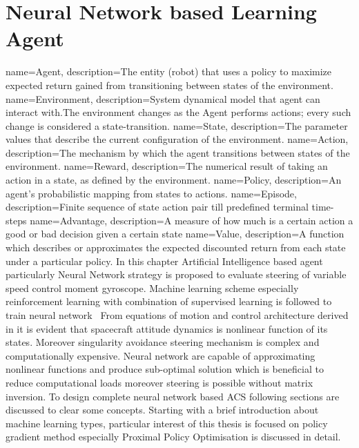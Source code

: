 \chapter{Neural Network based Learning Agent}
{
    name=Agent,
    description={The entity (robot) that uses a policy to maximize expected return gained from transitioning between states of the environment.}
}
{
    name=Environment,
    description={System dynamical model that agent can interact with.The environment changes as the Agent performs actions; every such change is considered a state-transition.}
}
{
    name=State,
    description={The parameter values that describe the current configuration of the environment.}
}
{
    name=Action,
    description={The mechanism by which the agent transitions between states of the environment.}
}
{
    name=Reward,
    description={The numerical result of taking an action in a state, as defined by the environment.}
}
{
    name=Policy,
    description={An agent's probabilistic mapping from states to actions.}
}
{
    name=Episode,
    description={Finite sequence of state action pair till predefined terminal time-steps}
}
{
    name=Advantage,
    description={A measure of how much is a certain action a good or bad decision given a certain state}
}
{
    name=Value,
    description={A function which describes or approximates the expected discounted return from each state under a particular policy.}
}
\label{chap:6}
In this chapter Artificial Intelligence based agent particularly Neural Network strategy is proposed to evaluate steering of variable speed control moment gyroscope. Machine learning scheme especially reinforcement learning with combination of supervised learning is followed to train neural network \ From equations of motion and control architecture derived in it is evident that spacecraft attitude dynamics is nonlinear function of its states. Moreover singularity avoidance steering mechanism is complex and computationally expensive. Neural network are capable of approximating nonlinear functions and produce sub-optimal solution which is beneficial to reduce computational loads moreover steering is possible without matrix inversion. To design complete neural network based ACS following sections are discussed to clear some concepts. Starting with a brief introduction about machine learning types, particular interest of this thesis is focused on policy gradient method especially Proximal Policy Optimisation is discussed in detail.

